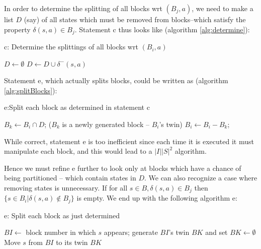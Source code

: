 In order to determine the splitting of all blocks wrt $(B_j, a)$, we need to make a list $D$ (say) of all states which must be removed from blocks--which satisfy the property $\delta(s,a)\in B_j$. Statement c thus looks like (algorithm \ref{alg:determine}):
\begin{algorithm}  
	\caption{c: Determine the splittings of all blocks wrt $(B_i, a)$} 
	\label{alg:determine} 
	\begin{algorithmic}%
		\State $D\gets\emptyset$
				\State $D\gets D\cup\delta^{-}(s,a)$
			\EndIf
		\EndFor
	\end{algorithmic}   
\end{algorithm}

Statement e, which actually splits blocks, could be written as (algorithm \ref{alg:splitBlocks}):
\begin{algorithm}  
	\caption{e:Split each block as determined in statement c} 
	\label{alg:splitBlocks} 
	\begin{algorithmic}%
			\State $B_k\gets B_i\cap D$; ($B_k$ is a newly generated block -- $B_i$'s twin)
			\State $B_i\gets B_i-B_k$;
		\EndFor
	\end{algorithmic}   
\end{algorithm}

While correct, statement e is too inefficient since each time it is executed it must manipulate each block, and this would lead to a $|I||S|^2$ algorithm. 

Hence we must refine e further to look only at blocks which have a chance of being partitioned -- which contain states in $D$. We can also recognize a case where removing states is unnecessary. If for all $s\in B,\delta(s,a)\in B_j$ then $\{s\in B_i|\delta(s,a)\notin B_j \}$ is empty. We end up with the following algorithm e:

\begin{algorithm}  
	\caption{e: Split each block as just determined} 
	\label{alg:splitBlocks_refine} 
	\begin{algorithmic}%
		\State $BI\gets$ block number in which $s$ appears;
		\Else 
				\State generate $BI$'s twin $BK$ and set $BK\gets\emptyset$
			\Else
				\State Move $s$ from $BI$ to its twin $BK$
			\EndIf
		\EndIf
	\end{algorithmic}   
\end{algorithm}

